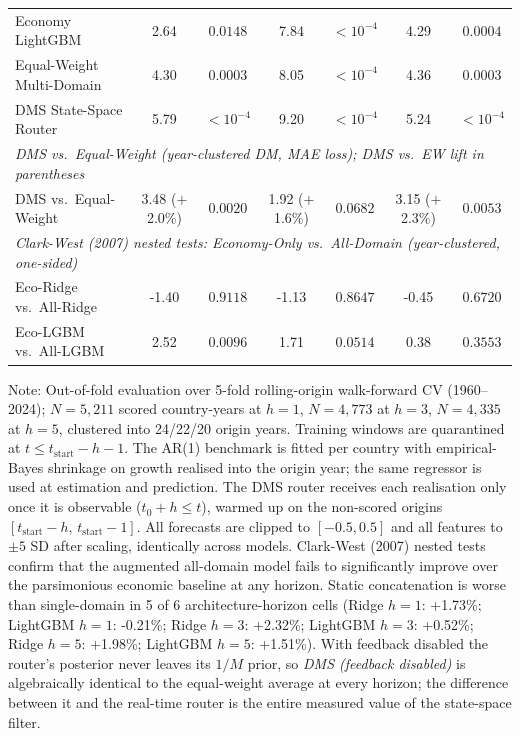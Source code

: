 \documentclass[11pt,a4paper]{article}
\begin{document}
\begin{table}[ht]
{\begin{tabular}{lcccccc}
\quad Economy LightGBM & 2.64 & $0.0148$ & 7.84 & $< 10^{-4}$ & 4.29 & $0.0004$ \\
\quad Equal-Weight Multi-Domain & 4.30 & $0.0003$ & 8.05 & $< 10^{-4}$ & 4.36 & $0.0003$ \\
\quad DMS State-Space Router & 5.79 & $< 10^{-4}$ & 9.20 & $< 10^{-4}$ & 5.24 & $< 10^{-4}$ \\
\midrule
\multicolumn{7}{l}{\footnotesize \textit{DMS vs.\ Equal-Weight (year-clustered DM, MAE loss); DMS vs.\ EW lift in parentheses}} \\
\quad DMS vs.\ Equal-Weight & 3.48 ($+$2.0\%) & $0.0020$ & 1.92 ($+$1.6\%) & $0.0682$ & 3.15 ($+$2.3\%) & $0.0053$ \\
\midrule
\multicolumn{7}{l}{\footnotesize \textit{Clark-West (2007) nested tests: Economy-Only vs.\ All-Domain (year-clustered, one-sided)}} \\
\quad Eco-Ridge vs.\ All-Ridge & -1.40 & $0.9118$ & -1.13 & $0.8647$ & -0.45 & $0.6720$ \\
\quad Eco-LGBM vs.\ All-LGBM & 2.52 & $0.0096$ & 1.71 & $0.0514$ & 0.38 & $0.3553$ \\
\bottomrule
\end{tabular}%
}
\begin{flushleft}
\footnotesize Note: Out-of-fold evaluation over 5-fold rolling-origin walk-forward CV (1960--2024); $N=5,211$ scored country-years at $h=1$, $N=4,773$ at $h=3$, $N=4,335$ at $h=5$, clustered into 24/22/20 origin years. Training windows are quarantined at $t \le t_{\text{start}} - h - 1$. The AR(1) benchmark is fitted per country with empirical-Bayes shrinkage on growth realised into the origin year; the same regressor is used at estimation and prediction. The DMS router receives each realisation only once it is observable ($t_0 + h \le t$), warmed up on the non-scored origins $[t_{\text{start}} - h,\, t_{\text{start}} - 1]$. All forecasts are clipped to $[-0.5, 0.5]$ and all features to $\pm 5$ SD after scaling, identically across models. Clark-West (2007) nested tests confirm that the augmented all-domain model fails to significantly improve over the parsimonious economic baseline at any horizon. Static concatenation is worse than single-domain in 5 of 6 architecture-horizon cells (Ridge $h=1$: +1.73\%; LightGBM $h=1$: -0.21\%; Ridge $h=3$: +2.32\%; LightGBM $h=3$: +0.52\%; Ridge $h=5$: +1.98\%; LightGBM $h=5$: +1.51\%). With feedback disabled the router's posterior never leaves its $1/M$ prior, so \textit{DMS (feedback disabled)} is algebraically identical to the equal-weight average at every horizon; the difference between it and the real-time router is the entire measured value of the state-space filter.
\end{flushleft}
\end{table}
\end{document}
